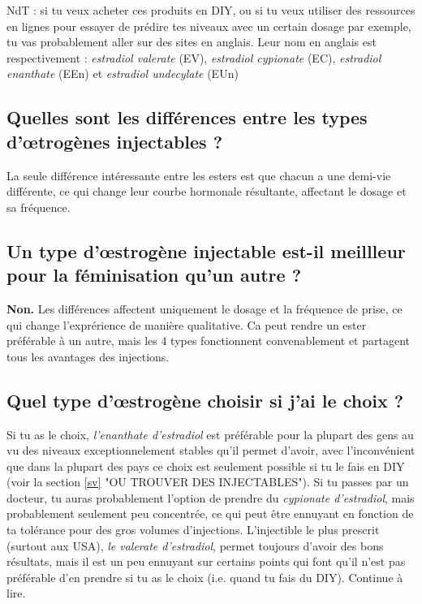 \documentclass{article}
\begin{document}
NdT : si tu veux acheter ces produits en DIY, ou si tu veux utiliser des ressources en lignes pour essayer de prédire tes niveaux avec un certain dosage par exemple, tu vas probablement aller sur des sites en anglais. Leur nom en anglais est respectivement : \textit{estradiol valerate} (EV), \textit{estradiol cypionate} (EC), \textit{estradiol enanthate} (EEn) et \textit{estradiol undecylate} (EUn)

\subsection{Quelles sont les différences entre les types d'œtrogènes injectables ?}

La seule différence intéressante entre les esters est que chacun a une demi-vie différente, ce qui change leur courbe hormonale résultante, affectant le dosage et sa fréquence.

\subsection{Un type d'œstrogène injectable est-il meillleur pour la féminisation qu'un autre ?}

\textbf{Non.} Les différences affectent uniquement le dosage et la fréquence de prise, ce qui change l'exprérience de manière qualitative. Ca peut rendre un ester préférable à un autre, mais les 4 types fonctionnent convenablement et partagent tous les avantages des injections.

\subsection{Quel type d'œstrogène choisir si j'ai le choix ?}

Si tu as le choix, \textit{l'enanthate d'estradiol} est préférable pour la plupart des gens au vu des niveaux exceptionnelement stables qu'il permet d'avoir, avec l'inconvénient que dans la plupart des pays ce choix est seulement possible si tu le fais en DIY (voir la section \ref{sv} "OU TROUVER DES INJECTABLES"). Si tu passes par un docteur, tu auras probablement l'option de prendre du \textit{cypionate d'estradiol}, mais probablement seulement peu concentrée, ce qui peut être ennuyant en fonction de ta tolérance pour des gros volumes d'injections. L'injectible le plus prescrit (surtout aux USA), \textit{le valerate d'estradiol}, permet toujours d'avoir des bons résultats, mais il est un peu ennuyant sur certains points qui font qu'il n'est pas préférable d'en prendre si tu as le choix (i.e. quand tu fais du DIY). Continue à lire.
\end{document}
